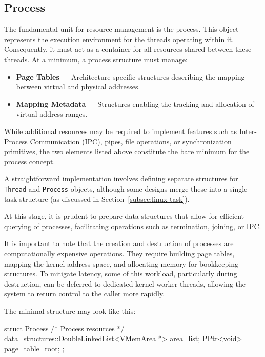 \documentclass[a4paper,10pt,twoside]{report}
\theoremstyle{definition}
\begin{document}
\subsection{Process}

The fundamental unit for resource management is the process. This object represents the execution environment for the threads operating within it. Consequently, it must act as a container for all resources shared between these threads. At a minimum, a process structure must manage:

\begin{itemize}
    \item \textbf{Page Tables} --- Architecture-specific structures describing the mapping between virtual and physical addresses.
    \item \textbf{Mapping Metadata} --- Structures enabling the tracking and allocation of virtual address ranges.
\end{itemize}

While additional resources may be required to implement features such as Inter-Process Communication (IPC), pipes, file operations, or synchronization primitives, the two elements listed above constitute the bare minimum for the process concept. 

A straightforward implementation involves defining separate structures for \texttt{Thread} and \texttt{Process} objects, although some designs merge these into a single task structure (as discussed in Section~\ref{subsec:linux-task}).

At this stage, it is prudent to prepare data structures that allow for efficient querying of processes, facilitating operations such as termination, joining, or IPC. 

It is important to note that the creation and destruction of processes are computationally expensive operations. They require building page tables, mapping the kernel address space, and allocating memory for bookkeeping structures. To mitigate latency, some of this workload, particularly during destruction, can be deferred to dedicated kernel worker threads, allowing the system to return control to the caller more rapidly.

\noindent The minimal structure may look like this:
\begin{cppcode}[caption={Process Structure}, label={lst:exampleProcessStruct}]
    struct Process {
        /* Process resources */
        data_structures::DoubleLinkedList<VMemArea *> area_list;
        PPtr<void> page_table_root;
    };
\end{cppcode}
\end{document}
